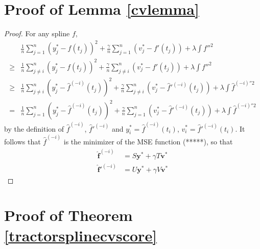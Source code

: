 \section{Proof of Lemma \ref{cvlemma}}
\begin{proof}
For any spline $f$, 
\begin{equation}
\begin{split}
&\frac{1}{n}\sum_{j=1}^{n}(y_j^*-f(t_j))^2+\frac{\gamma}{n} \sum_{j=1}^{n}(v_j^*-f'(t_j))+\lambda\int f''^2 \\
\geq&\frac{1}{n}\sum_{j\neq i}^{n}(y_j^*-f(t_j))^2+\frac{\gamma}{n} \sum_{j\neq i}^{n}(v_j^*-f'(t_j))+\lambda\int f''^2\\
\geq&\frac{1}{n}\sum_{j\neq i}^{n}(y_j^*-\hat{f}^{(-i)}(t_j))^2+\frac{\gamma}{n} \sum_{j\neq i}^{n}(v_j^*-\hat{f}'^{(-i)}(t_j))+\lambda\int \hat{f}^{(-i)''2}\\
=&\frac{1}{n}\sum_{j=1}^{n}(y_j^*-\hat{f}^{(-i)}(t_j))^2+\frac{\gamma}{n} \sum_{j=1}^{n}(v_j^*-\hat{f}'^{(-i)}(t_j))+\lambda\int \hat{f}^{(-i)''2}
\end{split}
\end{equation}
by the definition of $\hat{f}^{(-i)}$, $\hat{f}'^{(-i)}$ and $y_i^*=\hat{f}^{(-i)}(t_i)$, $v_i^*=\hat{f}'^{(-i)}(t_i)$. It follows that $\hat{f}^{(-i)}$ is the minimizer of the MSE function (*****), so that
\begin{align}
\mathbf{\hat{f}}^{(-i)}&=S\mathbf{y}^*+\gamma T\mathbf{v}^*\\
\mathbf{\hat{f}}'^{(-i)}&=U\mathbf{y}^*+\gamma V\mathbf{v}^*
\end{align}
\end{proof}


\section{Proof of Theorem \ref{tractorsplinecvscore}}

